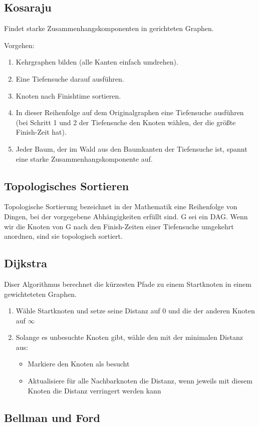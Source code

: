 \documentclass[11pt]{scrartcl}
\begin{document}
\subsection{Kosaraju}
Findet starke Zusammenhangskomponenten in gerichteten Graphen.

Vorgehen:
\begin{enumerate}
\item Kehrgraphen bilden (alle Kanten einfach umdrehen).
\item Eine Tiefensuche darauf ausführen.
\item Knoten nach Finishtime sortieren.
\item In dieser Reihenfolge auf dem Originalgraphen eine Tiefensuche ausführen (bei Schritt 1 und 2 der Tiefensuche den Knoten wählen, der die größte Finish-Zeit hat).
\item Jeder Baum, der im Wald aus den Baumkanten der Tiefensuche ist, spannt eine starke Zusammenhangskomponente auf.
\end{enumerate}
\subsection{Topologisches Sortieren}
Topologische Sortierung bezeichnet in der Mathematik eine Reihenfolge von Dingen, bei der vorgegebene Abhängigkeiten erfüllt sind.
G sei ein DAG. Wenn wir die Knoten von G nach den Finish-Zeiten einer Tiefensuche umgekehrt anordnen, sind sie topologisch sortiert.

\subsection{Dijkstra}
Diser Algorithmus berechnet die kürzesten Pfade zu einem Startknoten in einem gewichteteten Graphen.
\begin{enumerate}
	\item Wähle Startknoten und setze seine Distanz auf 0 und die der anderen Knoten auf $\infty$
    \item Solange es unbesuchte Knoten gibt, wähle den mit der minimalen Distanz aus:
    \begin{itemize}
		\item Markiere den Knoten als besucht
        \item Aktualisiere für alle Nachbarknoten die Distanz, wenn jeweils mit diesem Knoten die Distanz verringert werden kann
	\end{itemize}
\end{enumerate}

\subsection{Bellman und Ford}
\end{document}
